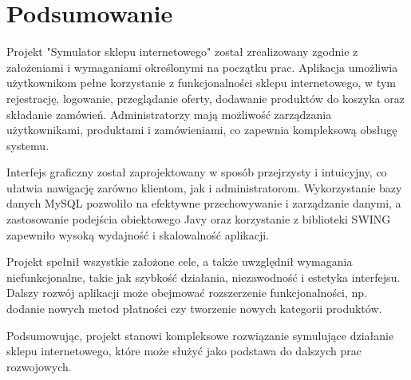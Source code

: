\chapter{Podsumowanie}
\label{cha:podsumowanie}

Projekt "Symulator sklepu internetowego" został zrealizowany zgodnie z założeniami i wymaganiami 
określonymi na początku prac. Aplikacja umożliwia użytkownikom pełne korzystanie z funkcjonalności sklepu internetowego, w tym rejestrację, logowanie, przeglądanie oferty, dodawanie produktów do koszyka oraz składanie zamówień. Administratorzy mają możliwość zarządzania użytkownikami, produktami i zamówieniami, co zapewnia kompleksową obsługę systemu.

Interfejs graficzny został zaprojektowany w sposób przejrzysty i intuicyjny, co ułatwia nawigację zarówno klientom, jak i administratorom. Wykorzystanie bazy danych MySQL pozwoliło na efektywne przechowywanie i zarządzanie danymi, a zastosowanie podejścia obiektowego Javy oraz korzystanie z biblioteki SWING zapewniło wysoką wydajność i skalowalność aplikacji.

Projekt spełnił wszystkie założone cele, a także uwzględnił wymagania niefunkcjonalne, takie jak szybkość działania, niezawodność i estetyka interfejsu. Dalszy rozwój aplikacji może obejmować rozszerzenie funkcjonalności, np. dodanie nowych metod płatności czy tworzenie nowych kategorii produktów.

Podsumowując, projekt stanowi kompleksowe rozwiązanie symulujące działanie sklepu internetowego, które może służyć jako podstawa do dalszych prac rozwojowych.